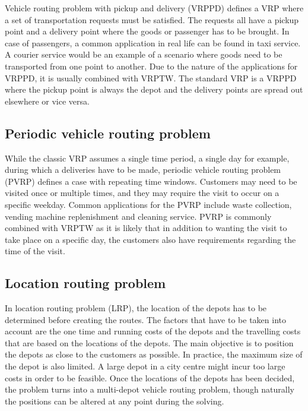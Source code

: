 Vehicle routing problem with pickup and delivery (VRPPD) defines a VRP where a set of transportation requests must be satisfied. The requests all have a pickup point and a delivery point where the goods or passenger has to be brought. In case of passengers, a common application in real life can be found in taxi service. A courier service would be an example of a scenario where goods need to be transported from one point to another. Due to the nature of the applications for VRPPD, it is usually combined with VRPTW. The standard VRP is a VRPPD where the pickup point is always the depot and the delivery points are spread out elsewhere or vice versa. \cite{desaulniers2000vrp}


\subsection{Periodic vehicle routing problem}

While the classic VRP assumes a single time period, a single day for example, during which a deliveries have to be made, periodic vehicle routing problem (PVRP) defines a case with repeating time windows. Customers may need to be visited once or multiple times, and they may require the visit to occur on a specific weekday. \cite{blakeley2003optimizing} Common applications for the PVRP include waste collection, vending machine replenishment and cleaning service. PVRP is commonly combined with VRPTW as it is likely that in addition to wanting the visit to take place on a specific day, the customers also have requirements regarding the time of the visit. \cite{yu2011ant}


\subsection{Location routing problem}

In location routing problem (LRP), the location of the depots has to be determined before creating the routes. The factors that have to be taken into account are the one time and running costs of the depots and the travelling costs that are based on the locations of the depots. The main objective is to position the depots as close to the customers as possible. In practice, the maximum size of the depot is also limited. A large depot in a city centre might incur too large costs in order to be feasible. Once the locations of the depots has been decided, the problem turns into a multi-depot vehicle routing problem, though naturally the positions can be altered at any point during the solving. \cite{tuzun1999two}



